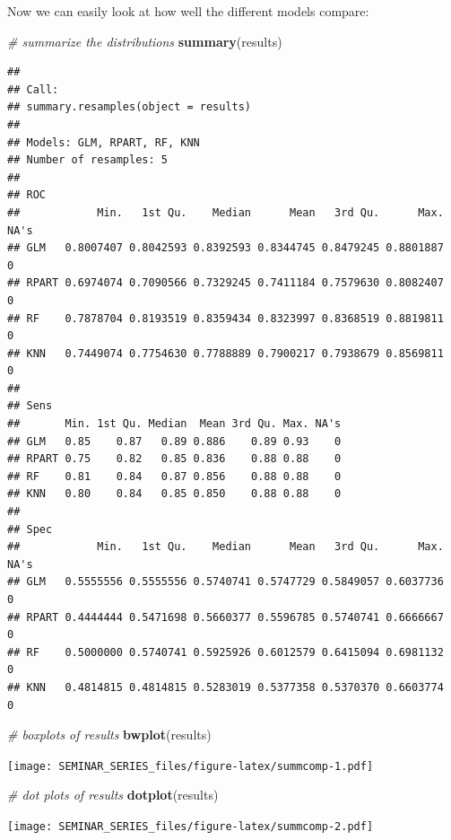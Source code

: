 \documentclass[]{book}
\newenvironment{Shaded}{\begin{snugshade}}{\end{snugshade}}
\newcommand{\KeywordTok}[1]{\textcolor[rgb]{0.13,0.29,0.53}{\textbf{#1}}}
\newcommand{\CommentTok}[1]{\textcolor[rgb]{0.56,0.35,0.01}{\textit{#1}}}
\newcommand{\NormalTok}[1]{#1}
\begin{document}
Now we can easily look at how well the different models compare:

\begin{Shaded}
\begin{Highlighting}[]
\CommentTok{# summarize the distributions}
\KeywordTok{summary}\NormalTok{(results)}
\end{Highlighting}
\end{Shaded}

\begin{verbatim}
## 
## Call:
## summary.resamples(object = results)
## 
## Models: GLM, RPART, RF, KNN 
## Number of resamples: 5 
## 
## ROC 
##            Min.   1st Qu.    Median      Mean   3rd Qu.      Max. NA's
## GLM   0.8007407 0.8042593 0.8392593 0.8344745 0.8479245 0.8801887    0
## RPART 0.6974074 0.7090566 0.7329245 0.7411184 0.7579630 0.8082407    0
## RF    0.7878704 0.8193519 0.8359434 0.8323997 0.8368519 0.8819811    0
## KNN   0.7449074 0.7754630 0.7788889 0.7900217 0.7938679 0.8569811    0
## 
## Sens 
##       Min. 1st Qu. Median  Mean 3rd Qu. Max. NA's
## GLM   0.85    0.87   0.89 0.886    0.89 0.93    0
## RPART 0.75    0.82   0.85 0.836    0.88 0.88    0
## RF    0.81    0.84   0.87 0.856    0.88 0.88    0
## KNN   0.80    0.84   0.85 0.850    0.88 0.88    0
## 
## Spec 
##            Min.   1st Qu.    Median      Mean   3rd Qu.      Max. NA's
## GLM   0.5555556 0.5555556 0.5740741 0.5747729 0.5849057 0.6037736    0
## RPART 0.4444444 0.5471698 0.5660377 0.5596785 0.5740741 0.6666667    0
## RF    0.5000000 0.5740741 0.5925926 0.6012579 0.6415094 0.6981132    0
## KNN   0.4814815 0.4814815 0.5283019 0.5377358 0.5370370 0.6603774    0
\end{verbatim}

\begin{Shaded}
\begin{Highlighting}[]
\CommentTok{# boxplots of results}
\KeywordTok{bwplot}\NormalTok{(results)}
\end{Highlighting}
\end{Shaded}

\texttt{[image: SEMINAR\_SERIES\_files/figure-latex/summcomp-1.pdf]}

\begin{Shaded}
\begin{Highlighting}[]
\CommentTok{# dot plots of results}
\KeywordTok{dotplot}\NormalTok{(results)}
\end{Highlighting}
\end{Shaded}

\texttt{[image: SEMINAR\_SERIES\_files/figure-latex/summcomp-2.pdf]}
\end{document}
